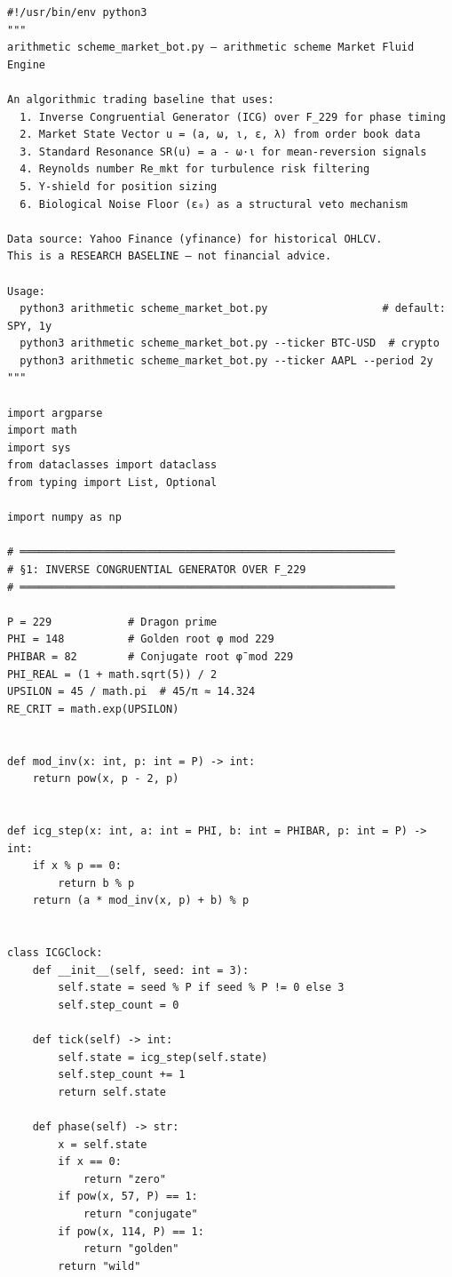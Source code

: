\begin{verbatim}
#!/usr/bin/env python3
"""
arithmetic scheme_market_bot.py — arithmetic scheme Market Fluid Engine

An algorithmic trading baseline that uses:
  1. Inverse Congruential Generator (ICG) over F_229 for phase timing
  2. Market State Vector u = (a, ω, ι, ε, λ) from order book data
  3. Standard Resonance SR(u) = a - ω·ι for mean-reversion signals
  4. Reynolds number Re_mkt for turbulence risk filtering
  5. Υ-shield for position sizing
  6. Biological Noise Floor (ε₀) as a structural veto mechanism

Data source: Yahoo Finance (yfinance) for historical OHLCV.
This is a RESEARCH BASELINE — not financial advice.

Usage:
  python3 arithmetic scheme_market_bot.py                  # default: SPY, 1y
  python3 arithmetic scheme_market_bot.py --ticker BTC-USD  # crypto
  python3 arithmetic scheme_market_bot.py --ticker AAPL --period 2y
"""

import argparse
import math
import sys
from dataclasses import dataclass
from typing import List, Optional

import numpy as np

# ═══════════════════════════════════════════════════════════
# §1: INVERSE CONGRUENTIAL GENERATOR OVER F_229
# ═══════════════════════════════════════════════════════════

P = 229            # Dragon prime
PHI = 148          # Golden root φ mod 229
PHIBAR = 82        # Conjugate root φ̄ mod 229
PHI_REAL = (1 + math.sqrt(5)) / 2
UPSILON = 45 / math.pi  # 45/π ≈ 14.324
RE_CRIT = math.exp(UPSILON)


def mod_inv(x: int, p: int = P) -> int:
    return pow(x, p - 2, p)


def icg_step(x: int, a: int = PHI, b: int = PHIBAR, p: int = P) -> int:
    if x % p == 0:
        return b % p
    return (a * mod_inv(x, p) + b) % p


class ICGClock:
    def __init__(self, seed: int = 3):
        self.state = seed % P if seed % P != 0 else 3
        self.step_count = 0

    def tick(self) -> int:
        self.state = icg_step(self.state)
        self.step_count += 1
        return self.state

    def phase(self) -> str:
        x = self.state
        if x == 0:
            return "zero"
        if pow(x, 57, P) == 1:
            return "conjugate"  
        if pow(x, 114, P) == 1:
            return "golden"     
        return "wild"           


\end{verbatim}
